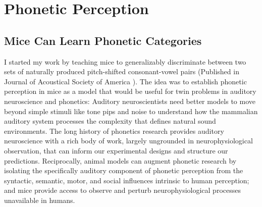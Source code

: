 \section{Phonetic Perception}
\label{sec:phonemes}
\subsection{Mice Can Learn Phonetic Categories}

I started my work by teaching mice to generalizably discriminate between two sets of naturally produced pitch-shifted consonant-vowel pairs (Published in Journal of Acoustical Society of America \cite{saundersMiceCanLearn2019}). The idea was to establish phonetic perception in mice as a model that would be useful for twin problems in auditory neuroscience and phonetics: Auditory neuroscientists need better models to move beyond simple stimuli like tone pips and noise to understand how the mammalian auditory system processes the complexity that defines natural sound environments. The long history of phonetics research provides auditory neuroscience with a rich body of work, largely ungrounded in neurophysiological observation, that can inform our experimental designs and structure our predictions. Reciprocally, animal models can augment phonetic research by isolating the specifically auditory component of phonetic perception from the syntactic, semantic, motor, and social influences intrinsic to human perception; and mice provide access to observe and perturb neurophysiological processes unavailable in humans.

